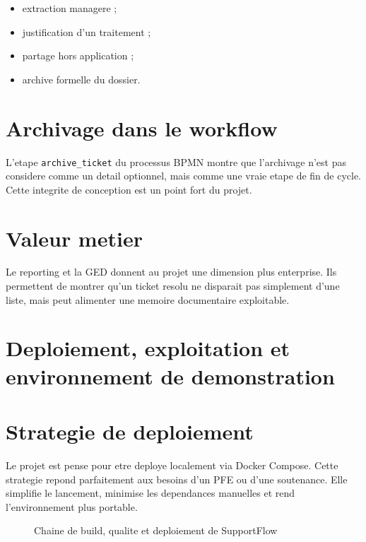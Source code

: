 \begin{itemize}[leftmargin=1.2cm]
  \item extraction managere ;
  \item justification d'un traitement ;
  \item partage hors application ;
  \item archive formelle du dossier.
\end{itemize}

\section{Archivage dans le workflow}

L'etape \texttt{archive\_ticket} du processus BPMN montre que l'archivage n'est pas considere comme un detail optionnel, mais comme une vraie etape de fin de cycle. Cette integrite de conception est un point fort du projet.

\section{Valeur metier}

Le reporting et la GED donnent au projet une dimension plus enterprise. Ils permettent de montrer qu'un ticket resolu ne disparait pas simplement d'une liste, mais peut alimenter une memoire documentaire exploitable.



\section{Deploiement, exploitation et environnement de demonstration}

\section{Strategie de deploiement}

Le projet est pense pour etre deploye localement via Docker Compose. Cette strategie repond parfaitement aux besoins d'un PFE ou d'une soutenance. Elle simplifie le lancement, minimise les dependances manuelles et rend l'environnement plus portable.

\begin{figure}[htbp]
  \centering
  \caption{Chaine de build, qualite et deploiement de SupportFlow}
\end{figure}

